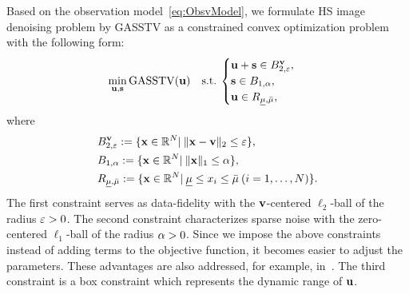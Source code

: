 Based on the observation model~\eqref{eq:ObsvModel}, we formulate HS image denoising problem by GASSTV as a constrained convex optimization problem with the following form:
\begin{equation}
    \label{prob:OptimProb}
    \min_{\mathbf{u}, \mathbf{s}} \text{GASSTV}(\mathbf{u}) \quad \mathrm{s.t.} \: 
    \begin{cases}
        \mathbf{u} + \mathbf{s} \in B_{2, \varepsilon}^{\mathbf{v}}, \\
        \mathbf{s} \in B_{1, \alpha}, \\
        \mathbf{u} \in R_{\underline{\mu},\bar{\mu}}, \\
    \end{cases}
\end{equation}
where
\begin{align}
    \label{eq:ConstL2ball}
    &B_{2, \varepsilon}^{\mathbf{v}} := \{ \mathbf{x} \in \mathbb{R}^{N} | \:
    \|\mathbf{x} - \mathbf{v}\|_2 \leq \varepsilon \}, \\
    \label{eq:ConstL1ball}
    &B_{1, \alpha} := \{ \mathbf{x} \in \mathbb{R}^{N} | \:
    \|\mathbf{x}\|_{1} \leq \alpha \}, \\
    \label{eq:ConstBox}
    &R_{\underline{\mu},\bar{\mu}} := \{ \mathbf{x} \in \mathbb{R}^{N} | \:
    \underline{\mu} \leq x_{i} \leq \bar{\mu}  \: (i = 1,\dots , N) \}.
\end{align}
The first constraint serves as data-fidelity with the $\mathbf{v}$-centered $\ell_2$-ball of the radius $\varepsilon > 0$.
The second constraint characterizes sparse noise with the zero-centered $\ell_1$-ball of the radius $\alpha > 0$.
Since we impose the above constraints instead of adding terms to the objective function, it becomes easier to adjust the parameters.
These advantages are also addressed, for example, in~\cite{Afonso2011Constraint, chierchia2015Constraint, Ono2015Constraint, Ono2017Constraint, Ono2019Constraint}.
The third constraint is a box constraint which represents the dynamic range of $\mathbf{u}$.

% 


% 
% 
